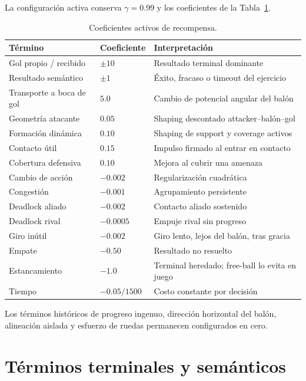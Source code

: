 \documentclass[11pt]{article}
\begin{document}
La configuración activa conserva $\gamma=0.99$ y los coeficientes de la
Tabla~\ref{tab:coefficients}.

\begin{table}[ht]
  \centering
  \caption{Coeficientes activos de recompensa.}
  \label{tab:coefficients}
  \begin{tabular}{@{}lll@{}}
    \toprule
    Término & Coeficiente & Interpretación \\
    \midrule
    Gol propio / recibido & $\pm 10$ & Resultado terminal dominante \\
    Resultado semántico & $\pm 1$ & Éxito, fracaso o timeout del ejercicio \\
    Transporte a boca de gol & $5.0$ & Cambio de potencial angular del balón \\
    Geometría atacante & $0.05$ & Shaping descontado attacker--balón--gol \\
    Formación dinámica & $0.10$ & Shaping de support y coverage activos \\
    Contacto útil & $0.15$ & Impulso firmado al entrar en contacto \\
    Cobertura defensiva & $0.10$ & Mejora al cubrir una amenaza \\
    Cambio de acción & $-0.002$ & Regularización cuadrática \\
    Congestión & $-0.001$ & Agrupamiento persistente \\
    Deadlock aliado & $-0.002$ & Contacto aliado sostenido \\
    Deadlock rival & $-0.0005$ & Empuje rival sin progreso \\
    Giro inútil & $-0.002$ & Giro lento, lejos del balón, tras gracia \\
    Empate & $-0.50$ & Resultado no resuelto \\
    Estancamiento & $-1.0$ & Terminal heredado; free-ball lo evita en juego \\
    Tiempo & $-0.05/1500$ & Costo constante por decisión \\
    \bottomrule
  \end{tabular}
\end{table}

Los términos históricos de progreso ingenuo, dirección horizontal del balón, alineación aislada
y esfuerzo de ruedas permanecen configurados en cero.

\section{Términos terminales y semánticos}
\end{document}
